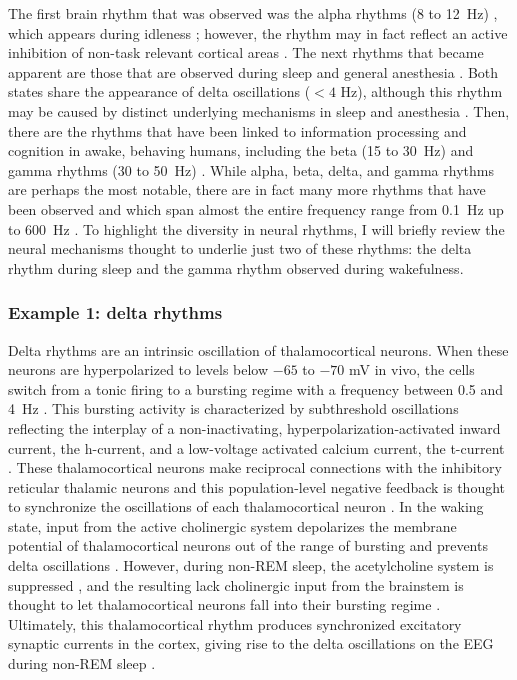 The first brain rhythm that was observed was the alpha rhythms (8 to \qty{12}{\hertz}) \cite{Berger1929}, which appears during idleness \cite{Adrian1934}; however, the rhythm may in fact reflect an active inhibition of non-task relevant cortical areas \cite{Cooper2003}. The next rhythms that became apparent are those that are observed during sleep \cite{Loomis1937,Weber2016} and general anesthesia \cite{GIBBS1937,Akeju2017}. Both states share the appearance of delta oscillations ($<4$ \unit{\hertz}), although this rhythm may be caused by distinct underlying mechanisms in sleep and anesthesia \cite{Akeju2017}. Then, there are the rhythms that have been linked to information processing and cognition in awake, behaving humans, including the beta (15 to \qty{30}{\hertz}) \cite{Spitzer2017} and gamma rhythms (30 to \qty{50}{\hertz}) \cite{JASPER1938,Fries2009}. While alpha, beta, delta, and gamma rhythms are perhaps the most notable, there are in fact many more rhythms that have been observed and which span almost the entire frequency range from \qty{0.1}{\hertz} up to \qty{600}{\hertz} \cite{Penttonen2003}. To highlight the diversity in neural rhythms, I will briefly review the neural mechanisms thought to underlie just two of these rhythms: the delta rhythm during sleep and the gamma rhythm observed during wakefulness.

\subsubsection{Example 1: delta rhythms}
Delta rhythms are an intrinsic oscillation of thalamocortical neurons. When these neurons are hyperpolarized to levels below $-65$ to $-70$ \unit{\milli\volt} in vivo, the cells switch from a tonic firing to a bursting regime with a frequency between 0.5 and \qty{4}{\hertz} \cite{Dossi1992}. This bursting activity is characterized by subthreshold oscillations reflecting the interplay of a non-inactivating, hyperpolarization-activated inward current, the h-current, and a low-voltage activated calcium current, the t-current \cite{McCormick1990,Soltesz1991}. These thalamocortical neurons make reciprocal connections with the inhibitory reticular thalamic neurons and this population-level negative feedback is thought to synchronize the oscillations of each thalamocortical neuron \cite{Steriade1991, Steriade1993}. In the waking state, input from the active cholinergic system depolarizes the membrane potential of thalamocortical neurons out of the range of bursting and prevents delta oscillations \cite{Steriade2003}. However, during non-REM sleep, the acetylcholine system is suppressed \cite{Watson2010}, and the resulting lack cholinergic input from the brainstem is thought to let thalamocortical neurons fall into their bursting regime \cite{Steriade2003}. Ultimately, this thalamocortical rhythm produces synchronized excitatory synaptic currents in the cortex, giving rise to the delta oscillations on the EEG during non-REM sleep \cite{Amzica1998}.

